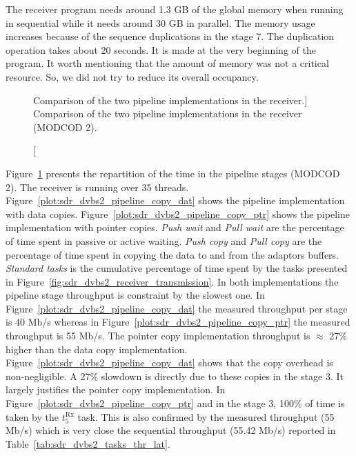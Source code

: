 The receiver program needs around 1.3 GB of the global memory when running in
sequential while it needs around 30 GB in parallel. The memory usage increases
because of the sequence duplications in the stage 7. The duplication operation
takes about 20 seconds. It is made at the very beginning of the program. It
worth mentioning that the amount of memory was not a critical resource. So, we
did not try to reduce its overall occupancy.

\begin{figure}[htp]
  \centering
  \quad
  \caption
    [Comparison of the two pipeline implementations in the receiver.]
    {Comparison of the two pipeline implementations in the receiver (MODCOD 2).}
  \label{plot:sdr_dvbs2_pipeline}
\end{figure}

Figure~\ref{plot:sdr_dvbs2_pipeline} presents the repartition of the time in the
pipeline stages (MODCOD 2). The receiver is running over 35 threads.
Figure~\ref{plot:sdr_dvbs2_pipeline_copy_dat} shows the pipeline implementation
with data copies. Figure~\ref{plot:sdr_dvbs2_pipeline_copy_ptr} shows the
pipeline implementation with pointer copies. \emph{Push wait} and \emph{Pull
wait} are the percentage of time spent in passive or active waiting. \emph{Push
copy} and \emph{Pull copy} are the percentage of time spent in copying the data
to and from the adaptors buffers. \emph{Standard tasks} is the cumulative
percentage of time spent by the tasks presented in
Figure~\ref{fig:sdr_dvbs2_receiver_transmission}. In both implementations the
pipeline stage throughput is constraint by the slowest one. In
Figure~\ref{plot:sdr_dvbs2_pipeline_copy_dat} the measured throughput per stage
is 40 Mb/s whereas in Figure~\ref{plot:sdr_dvbs2_pipeline_copy_ptr} the
measured throughput is 55 Mb/s. The pointer copy implementation throughput is
$\approx$ 27\% higher than the data copy implementation.
Figure~\ref{plot:sdr_dvbs2_pipeline_copy_dat} shows that the copy overhead is
non-negligible. A 27\% slowdown is directly due to these copies in the stage 3.
It largely justifies the pointer copy implementation. In
Figure~\ref{plot:sdr_dvbs2_pipeline_copy_ptr} and in the stage 3, 100\% of time
is taken by the $t^\text{Rx}_{5}$ task. This is also confirmed by the measured
throughput (55 Mb/s) which is very close the sequential throughput (55.42
Mb/s) reported in Table~\ref{tab:sdr_dvbs2_tasks_thr_lat}.

